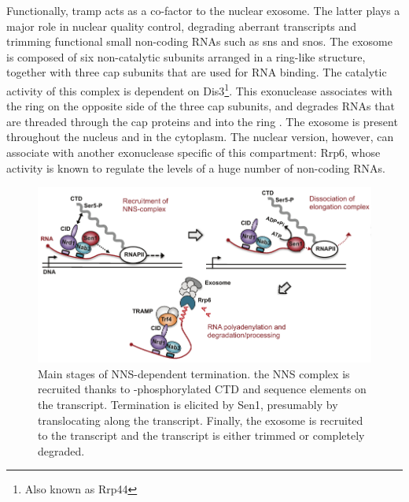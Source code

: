 Functionally, \gls{tramp} acts as a co-factor to the nuclear exosome.
The latter plays a major role in nuclear quality control, degrading aberrant transcripts and trimming functional small non-coding RNAs such as \gls{sns} and \gls{snos}.
The exosome is composed of six non-catalytic subunits arranged in a ring-like structure, together with three cap subunits that are used for RNA binding.
The catalytic activity of this complex is dependent on Dis3\footnote{Also known as Rrp44}.
This \TtoF{} exonuclease associates with the ring on the opposite side of the three cap subunits, and degrades RNAs that are threaded through the cap proteins and into the ring \cite{makino:2015:rna}.
The exosome is present throughout the nucleus and in the cytoplasm.
The nuclear version, however, can associate with another exonuclease specific of this compartment: Rrp6, whose activity is known to regulate the levels of a huge number of non-coding RNAs.

\begin{figure}[ht]

\centering
\includegraphics[width=\textwidth]{figures/introduction/nns}
\caption[Mechanism of NNS termination]{Main stages of NNS-dependent termination. the NNS complex is recruited thanks to \serf{}-phosphorylated CTD and sequence elements on the transcript. Termination is elicited by Sen1, presumably by translocating along the transcript. Finally, the exosome is recruited to the transcript and the transcript is either trimmed or completely degraded.}
\label{fig:nnsTermination}

\end{figure}


